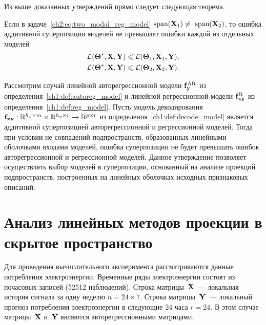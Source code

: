 Из выше доказанных утверждений прямо следует следующая теорема.

\begin{theorem}
	Если в задаче~\eqref{ch2:eq:two_modal_reg_model} $\text{span}(\mathbf{X}_1) \neq \text{ span}(\mathbf{X}_2)$, то ошибка аддитивной суперпозиции моделей не превышает ошибки каждой из отдельных моделей
	\begin{align*}
		\mathcal{L}(\boldsymbol{\Theta}^*, \mathbf{X}, \mathbf{Y}) &\leqslant \mathcal{L}(\boldsymbol{\Theta}_1, \mathbf{X}_1, \mathbf{Y}), \\
		\mathcal{L}(\boldsymbol{\Theta}^*, \mathbf{X}, \mathbf{Y}) &\leqslant \mathcal{L}(\boldsymbol{\Theta}_2, \mathbf{X}_2, \mathbf{Y}).
	\end{align*}
\end{theorem}

Рассмотрим случай линейной авторегрессионной модели $\mathbf{f}^{\text{AR}}_{\mathbf{y}}$ из определения~\ref{ch1:def:autoreg_model} и линейной регрессионной модели $\mathbf{f}^{\text{R}}_{\mathbf{x}\mathbf{y}}$ из определения~\ref{ch1:def:reg_model}. 
Пусть модель декодирования $\mathbf{f}_{\mathbf{x}\mathbf{y}}: \mathbb{R}^{h_x \times m} \times \mathbb{R}^{h_y \times r} \rightarrow \mathbb{R}^{p \times r}$ из определения~\ref{ch1:def:decode_model} является аддитивной суперпозицией авторегрессионной и регрессионной моделей.
Тогда при условии не совпадений подпространств, образованных линейными оболочками входами моделей, ошибка суперпозиции не будет превышать ошибок авторегрессионной и регрессионной моделей.
Данное утверждение позволяет осуществлять выбор моделей в суперпозиции, основанный на анализе проекций подпространств, построенных на линейных оболочках исходных признаковых описаний.

\section{Анализ линейных методов проекции в скрытое пространство}
\label{sec:ch2:exp_linear}

Для проведения вычислительного эксперимента рассматриваются данные потребления электроэнергии.
Временные ряды электроэнергии состоят из почасовых записей (52512 наблюдений). 
Строка матрицы~$\mathbf{X}$~--- локальная история сигнала за одну неделю $n = 24 \times 7$. 
Строка матрицы~$\mathbf{Y}$~--- локальный прогноз потребления электроэнергии в следующие 24 часа $r = 24$. 
В этом случае матрицы~$\mathbf{X}$ и~$\mathbf{Y}$ являются авторегрессионными матрицами.

